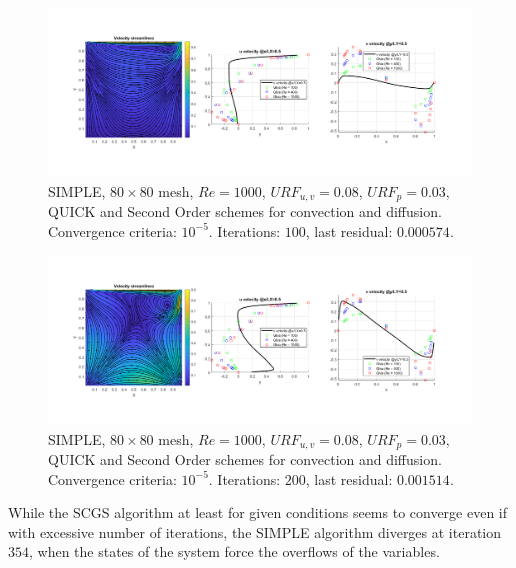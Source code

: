 \begin{figure}[H]
    \centering
    \includegraphics[width=\textwidth]{img/New/100_SIMPLE_80x80_008_003_QUICK.png}
    \caption{SIMPLE, $80\times80$ mesh, $Re=1000$, $URF_{u,v}=0.08$, $URF_p=0.03$, QUICK and Second Order schemes for convection and diffusion. Convergence criteria: $10^{-5}$. Iterations: $100$, last residual: $0.000574$.}
    \label{fig:100_SIMPLE_80x80_008_003_QUICK}
\end{figure}

\begin{figure}[H]
    \centering
    \includegraphics[width=\textwidth]{img/New/200_SIMPLE_80x80_008_003_QUICK.png}
    \caption{SIMPLE, $80\times80$ mesh, $Re=1000$, $URF_{u,v}=0.08$, $URF_p=0.03$, QUICK and Second Order schemes for convection and diffusion. Convergence criteria: $10^{-5}$. Iterations: $200$, last residual: $0.001514$.}
    \label{fig:200_SIMPLE_80x80_008_003_QUICK}
\end{figure}

While the SCGS algorithm at least for given conditions seems to converge even if with excessive number of iterations, the SIMPLE algorithm diverges at iteration $354$, when the states of the system force the overflows of the variables.